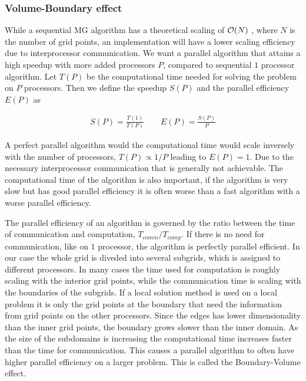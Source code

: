 		\subsubsection{Volume-Boundary effect}
		While a sequential MG algorithm has a theoretical scaling of \(\order{N}\)
		\citep{press_numerical_1988}, where \(N\) is the number of grid points, an
		implementation will have a lower scaling efficiency due to interprocessor
		communication. We want a parallel algorithm that attains a high speedup with
		more added processors \(P\),  compared to sequential \(1\) processor algorithm.
		Let \(T(P)\) be the computational time needed for solving the problem on \(P\)
		processors. Then we define the speedup \(S(P)\) and the parallel efficiency \(E(P)\) as

		\begin{align}
			S(P) = \frac{T(1)}{T(P)} \qquad E(P) = \frac{S(P)}{P}
		\end{align}

		A perfect parallel algorithm would the computational time would scale inversely
		with the number of processors, \(T(P) \propto 1/P\) leading to \( E(P) =1 \).
		Due to the necessary interprocessor communication that is generally not
		achievable. The computational time of the algorithm is also important, if
		the algorithm is very slow but has good parallel efficiency it is often
		worse than a fast algorithm with a worse parallel efficiency.

		The parallel efficiency of an algorithm is governed by the ratio between the
		time of communication and computation, \(T_{comm}/T_{comp}\). If there is no
		need for communication, like on \(1\) processor, the algorithm is perfectly
		parallel efficient. In our case the whole grid is diveded into several subgrids,
		which is assigned to different processors. In many cases the time used for
		computation is roughly scaling with the interior grid points, while the
		communication time is scaling with the boundaries of the subgrids. If a
		local solution method is used on a local problem it is only the grid points
		at the boundary that need the information from grid points on the other
		processors. Since the edges has lower dimensionality than the inner grid
		points, the boundary grows slower than the inner domain. As the size of the subdomains is increasing
		the computational time increases
		faster than the time for communication. This causes a parallel algorithm to often have
		higher parallel efficiency on a larger problem. This is called the Boundary-Volume effect.

